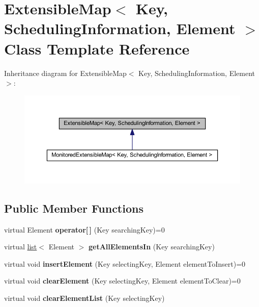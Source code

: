 \hypertarget{class_extensible_map}{
\section{ExtensibleMap$<$ Key, SchedulingInformation, Element $>$ Class Template Reference}
\label{class_extensible_map}
}


Inheritance diagram for ExtensibleMap$<$ Key, SchedulingInformation, Element $>$:\nopagebreak
\begin{figure}[H]
\begin{center}
\leavevmode
\includegraphics[width=382pt]{class_extensible_map__inherit__graph}
\end{center}
\end{figure}
\subsection*{Public Member Functions}
\begin{DoxyCompactItemize}
\item 
\hypertarget{class_extensible_map_abe129c431e310128f63940f622f3fad5}{
virtual Element {\bfseries operator\mbox{[}$\,$\mbox{]}} (Key searchingKey)=0}
\label{class_extensible_map_abe129c431e310128f63940f622f3fad5}

\item 
\hypertarget{class_extensible_map_aa866979ad846b6a6a402248f9564b45b}{
virtual \hyperlink{classlist}{list}$<$ Element $>$ {\bfseries getAllElementsIn} (Key searchingKey)}
\label{class_extensible_map_aa866979ad846b6a6a402248f9564b45b}

\item 
\hypertarget{class_extensible_map_ac785d6c6eaaa623981c38fb806948045}{
virtual void {\bfseries insertElement} (Key selectingKey, Element elementToInsert)=0}
\label{class_extensible_map_ac785d6c6eaaa623981c38fb806948045}

\item 
\hypertarget{class_extensible_map_a781823dc26dc419b8a01c45afe1fad44}{
virtual void {\bfseries clearElement} (Key selectingKey, Element elementToClear)=0}
\label{class_extensible_map_a781823dc26dc419b8a01c45afe1fad44}

\item 
\hypertarget{class_extensible_map_a55d3d0a31f90b38574d4ec65c24196c6}{
virtual void {\bfseries clearElementList} (Key selectingKey)}
\label{class_extensible_map_a55d3d0a31f90b38574d4ec65c24196c6}

\end{DoxyCompactItemize}
